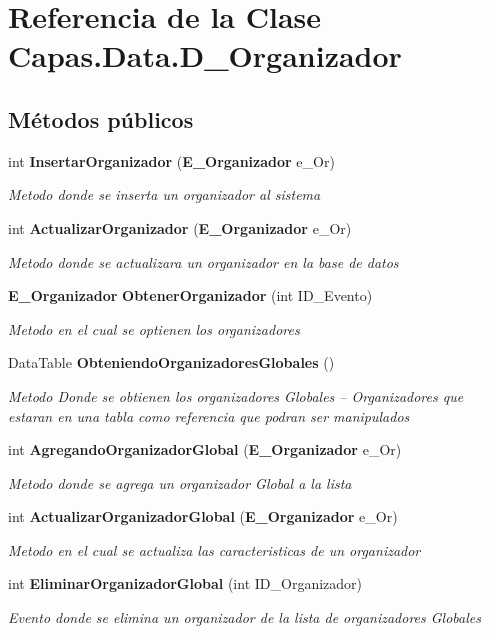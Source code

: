 \section{Referencia de la Clase Capas.\+Data.\+D\+\_\+\+Organizador}
\label{class_capas_1_1_data_1_1_d___organizador}
\subsection*{Métodos públicos}
\begin{DoxyCompactItemize}
\item 
int {\bf Insertar\+Organizador} ({\bf E\+\_\+\+Organizador} e\+\_\+\+Or)
\begin{DoxyCompactList}\small\item\em Metodo donde se inserta un organizador al sistema \end{DoxyCompactList}\item 
int {\bf Actualizar\+Organizador} ({\bf E\+\_\+\+Organizador} e\+\_\+\+Or)
\begin{DoxyCompactList}\small\item\em Metodo donde se actualizara un organizador en la base de datos \end{DoxyCompactList}\item 
{\bf E\+\_\+\+Organizador} {\bf Obtener\+Organizador} (int I\+D\+\_\+\+Evento)
\begin{DoxyCompactList}\small\item\em Metodo en el cual se optienen los organizadores \end{DoxyCompactList}\item 
Data\+Table {\bf Obteniendo\+Organizadores\+Globales} ()
\begin{DoxyCompactList}\small\item\em Metodo Donde se obtienen los organizadores Globales -- Organizadores que estaran en una tabla como referencia que podran ser manipulados \end{DoxyCompactList}\item 
int {\bf Agregando\+Organizador\+Global} ({\bf E\+\_\+\+Organizador} e\+\_\+\+Or)
\begin{DoxyCompactList}\small\item\em Metodo donde se agrega un organizador Global a la lista \end{DoxyCompactList}\item 
int {\bf Actualizar\+Organizador\+Global} ({\bf E\+\_\+\+Organizador} e\+\_\+\+Or)
\begin{DoxyCompactList}\small\item\em Metodo en el cual se actualiza las caracteristicas de un organizador \end{DoxyCompactList}\item 
int {\bf Eliminar\+Organizador\+Global} (int I\+D\+\_\+\+Organizador)
\begin{DoxyCompactList}\small\item\em Evento donde se elimina un organizador de la lista de organizadores Globales \end{DoxyCompactList}\end{DoxyCompactItemize}


